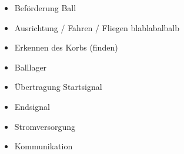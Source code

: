 \documentclass[a4paper,10pt,fleqn]{article}
\begin{document}
\begin{itemize}
    \item Beförderung Ball
    \item Ausrichtung / Fahren / Fliegen
        blablabalbalb
    \item Erkennen des Korbs (finden)
    \item Balllager
    \item Übertragung Startsignal
    \item Endsignal
    \item Stromversorgung
    \item Kommunikation
\end{itemize}
\end{document}
